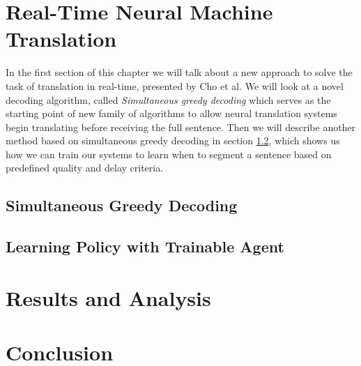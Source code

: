 \documentclass{sfuthesis}
\begin{document}
\chapter{Real-Time Neural Machine Translation}
In the first section of this chapter we will talk about a new approach to solve the task of translation in real-time, presented by Cho et al. We will look at a novel decoding algorithm, called \textit{Simultaneous greedy decoding} which serves as the starting point of  new family of algorithms to allow neural translation systems begin translating before receiving the full sentence. Then we will describe another method based on simultaneous greedy decoding in section \ref{sec:TA}, which shows us how we can train our systems to learn when to segment a sentence based on predefined quality and delay criteria.

\section{Simultaneous Greedy Decoding} \label{sec:SGD}


\section{Learning Policy with Trainable Agent} \label{sec:TA}


\chapter{Results and Analysis}


\chapter{Conclusion}



%
%
%
%
%

\backmatter%
	
	

\end{document}
